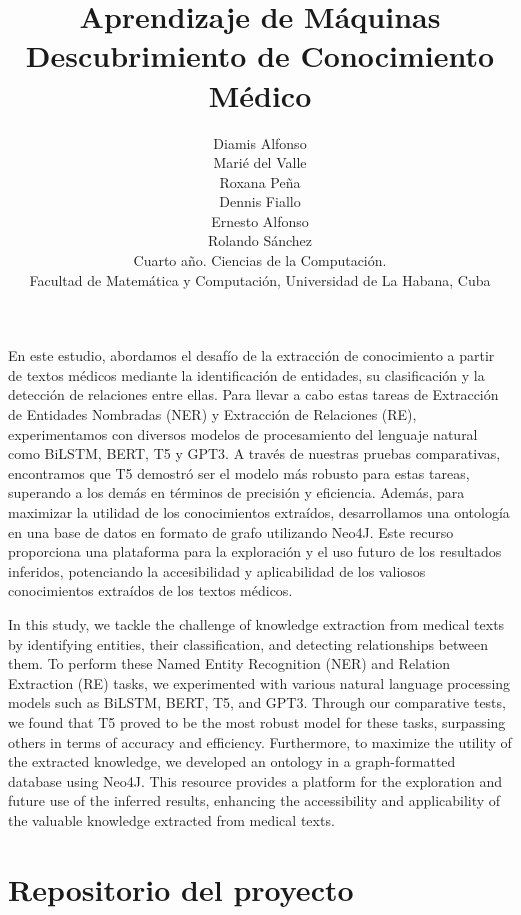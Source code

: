 \documentclass[10pt]{article} %
\title{\normalsize{Aprendizaje de M\'aquinas}\\
	\Huge\bfseries Descubrimiento de Conocimiento M\'edico \\
} %
\author{%
	Diamis Alfonso \\ Mari\'e del Valle \\ Roxana Pe\~na \\ Dennis Fiallo \\ Ernesto Alfonso \\ Rolando S\'anchez
	 \vspace{1em} \\
	\small Cuarto a\~no. Ciencias de la Computaci\'on. \\ %
	\small Facultad de Matem\'atica y Computaci\'on, Universidad de La Habana, Cuba \\ %
}
\date{} %
\renewenvironment{abstract}
{\small
	\begin{center}
		\bfseries \abstractname\vspace{-.5em}\vspace{0pt}
	\end{center}
	\list{}{
		\setlength{\leftmargin}{1.5cm}%
		\setlength{\rightmargin}{\leftmargin}%
	}%
	\item\relax}
{\endlist}
\begin{document}
	\maketitle
	
	\begin{abstract}		
		En este estudio, abordamos el desafío de la extracción de conocimiento a partir de textos médicos mediante la identificación de entidades, su clasificación y la detección de relaciones entre ellas. Para llevar a cabo estas tareas de Extracción de Entidades Nombradas (NER) y Extracción de Relaciones (RE), experimentamos con diversos modelos de procesamiento del lenguaje natural como BiLSTM, BERT, T5 y GPT3. A través de nuestras pruebas comparativas, encontramos que T5 demostró ser el modelo más robusto para estas tareas, superando a los demás en términos de precisión y eficiencia. Además, para maximizar la utilidad de los conocimientos extraídos, desarrollamos una ontología en una base de datos en formato de grafo utilizando Neo4J. Este recurso proporciona una plataforma para la exploración y el uso futuro de los resultados inferidos, potenciando la accesibilidad y aplicabilidad de los valiosos conocimientos extraídos de los textos médicos.	
	\end{abstract}

	\begin{abstract}		
	In this study, we tackle the challenge of knowledge extraction from medical texts by identifying entities, their classification, and detecting relationships between them. To perform these Named Entity Recognition (NER) and Relation Extraction (RE) tasks, we experimented with various natural language processing models such as BiLSTM, BERT, T5, and GPT3. Through our comparative tests, we found that T5 proved to be the most robust model for these tasks, surpassing others in terms of accuracy and efficiency. Furthermore, to maximize the utility of the extracted knowledge, we developed an ontology in a graph-formatted database using Neo4J. This resource provides a platform for the exploration and future use of the inferred results, enhancing the accessibility and applicability of the valuable knowledge extracted from medical texts.
	\end{abstract}

	\section{Repositorio del proyecto}
	
\end{document}

